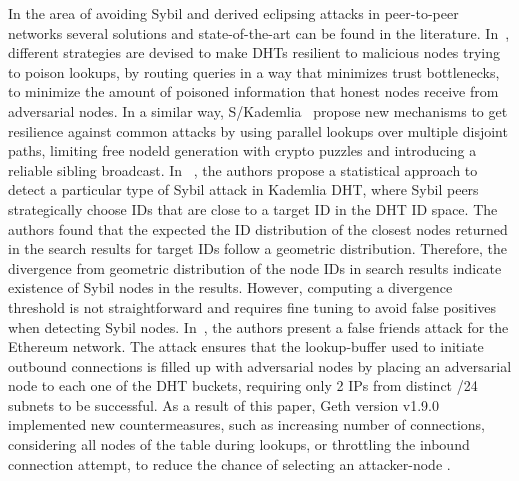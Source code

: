






In the area of avoiding Sybil and derived eclipsing attacks in peer-to-peer networks several solutions and state-of-the-art can be found in the literature.
In~\cite{danezis2005sybil},  different strategies are devised to make DHTs resilient to malicious nodes trying to poison lookups,  by routing queries in a way that minimizes trust bottlenecks,  to minimize the amount of poisoned information that honest nodes receive from adversarial nodes.
In a similar way,  S/Kademlia~\cite{skad} propose new mechanisms to get resilience against common attacks by using parallel lookups over multiple disjoint paths,  limiting free nodeld generation with crypto puzzles and introducing a reliable sibling broadcast.
In ~\cite{cholez2010efficient},  the authors propose  a statistical approach to detect a particular type of Sybil attack in  Kademlia DHT,  where Sybil peers strategically choose IDs that are close to a target ID in the DHT ID space.
The authors found that the expected the ID distribution of the closest nodes returned in the search results for target IDs follow a geometric distribution. Therefore, the divergence from geometric distribution of the node IDs in search results indicate existence of Sybil nodes in the results.  However, computing a divergence threshold is not straightforward and requires fine tuning to avoid false positives when detecting Sybil nodes.
In~\cite{henningsen2019eclipsing},  the authors present  a false friends attack for the Ethereum network.  
The attack ensures that the lookup-buffer used to initiate outbound connections is filled up with adversarial nodes by placing an adversarial node to each one of the DHT buckets, requiring only  2 IPs from distinct /24 subnets to be successful.
As a result of this paper, Geth version v1.9.0 implemented new countermeasures,  such as  increasing number of connections, considering all nodes of the table during lookups,  or throttling the inbound connection attempt,  to reduce the chance of selecting an attacker-node .

